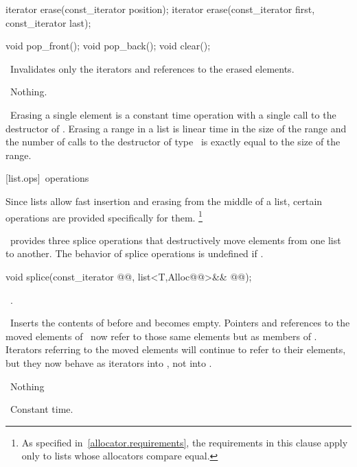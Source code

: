 \documentclass[american,twoside]{book}
\begin{document}
%
\begin{itemdecl}
iterator erase(const_iterator position);
iterator erase(const_iterator first, const_iterator last);

void pop_front();
void pop_back();
void clear();
\end{itemdecl}

\begin{itemdescr}
\pnum
\effects\ 
Invalidates only the iterators and references to the erased elements.

\pnum
\throws\ 
Nothing.

\pnum
\complexity\ 
Erasing a single element is a constant time operation with a single call to the destructor of
.
Erasing a range in a list is linear time in the
size of the range and the number of calls to the destructor of type
\tcode{T}\
is exactly equal to the size of the range.
\end{itemdescr}

\rSec3[list.ops]{\ operations}

\pnum
Since lists allow fast insertion and erasing from the middle of a list, certain operations are provided
specifically for them.%
\footnote{As specified in~\ref{allocator.requirements}, the requirements
in this clause apply only to lists whose allocators compare equal.
}

\pnum
\tcode{list}\
provides three splice operations that destructively move elements from one list to another. The behavior of splice operations is undefined if .

%
\begin{itemdecl}
void splice(const_iterator @@, list<T,Alloc@@>&& @@);
\end{itemdecl}

\begin{itemdescr}
\pnum
\requires\ 
\tcode{\&\farg{x} != this}.

\pnum
\effects\ 
Inserts the contents of
before
\tcode{position}
and
becomes empty.
Pointers and references to the moved elements of
\tcode{x}\
now refer to those same elements but as members of
.
Iterators referring to the moved elements will continue to refer to their
elements, but they now behave as iterators into
,
not into
\tcode{x}.

\pnum
\throws\ 
Nothing

\pnum
\complexity\ 
Constant time.
\end{itemdescr}
\end{document}
